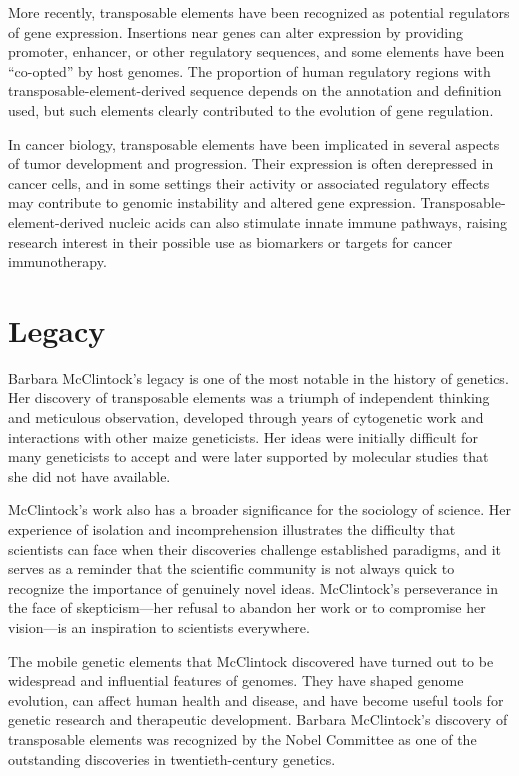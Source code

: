More recently, transposable elements have been recognized as potential regulators of gene expression. Insertions near genes can alter expression by providing promoter, enhancer, or other regulatory sequences, and some elements have been ``co-opted'' by host genomes. The proportion of human regulatory regions with transposable-element-derived sequence depends on the annotation and definition used, but such elements clearly contributed to the evolution of gene regulation.

In cancer biology, transposable elements have been implicated in several aspects of tumor development and progression. Their expression is often derepressed in cancer cells, and in some settings their activity or associated regulatory effects may contribute to genomic instability and altered gene expression. Transposable-element-derived nucleic acids can also stimulate innate immune pathways, raising research interest in their possible use as biomarkers or targets for cancer immunotherapy.

\section{Legacy}

Barbara McClintock's legacy is one of the most notable in the history of genetics. Her discovery of transposable elements was a triumph of independent thinking and meticulous observation, developed through years of cytogenetic work and interactions with other maize geneticists. Her ideas were initially difficult for many geneticists to accept and were later supported by molecular studies that she did not have available.

McClintock's work also has a broader significance for the sociology of science. Her experience of isolation and incomprehension illustrates the difficulty that scientists can face when their discoveries challenge established paradigms, and it serves as a reminder that the scientific community is not always quick to recognize the importance of genuinely novel ideas. McClintock's perseverance in the face of skepticism---her refusal to abandon her work or to compromise her vision---is an inspiration to scientists everywhere.

The mobile genetic elements that McClintock discovered have turned out to be widespread and influential features of genomes. They have shaped genome evolution, can affect human health and disease, and have become useful tools for genetic research and therapeutic development. Barbara McClintock's discovery of transposable elements was recognized by the Nobel Committee as one of the outstanding discoveries in twentieth-century genetics.


